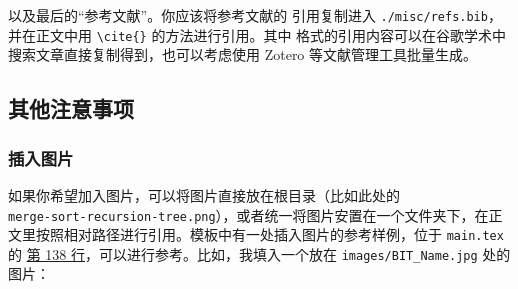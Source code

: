 \begin{table}[H]
\centering
\caption{开题报告内容概要}
\label{tab:proposalreport}
\end{table}

以及最后的“参考文献”。你应该将参考文献的 {} 引用复制进入 \texttt{./misc/refs.bib}，并在正文中用 \verb|\cite{}| 的方法进行引用。其中 {} 格式的引用内容可以在谷歌学术中搜索文章直接复制得到，也可以考虑使用 Zotero 等文献管理工具批量生成。

\subsection{其他注意事项}
\subsubsection{插入图片}
如果你希望加入图片，可以将图片直接放在根目录（比如此处的\\ \texttt{merge-sort-recursion-tree.png}），或者统一将图片安置在一个文件夹下，在正文里按照相对路径进行引用。模板中有一处插入图片的参考样例，位于 \texttt{main.tex} 的 \href{https://github.com/spencerwooo/BIThesis/blob/master/proposal-report/main.tex#L138}{第 138 行}，可以进行参考。比如，我填入一个放在 \texttt{images/BIT\_Name.jpg} 处的图片：

